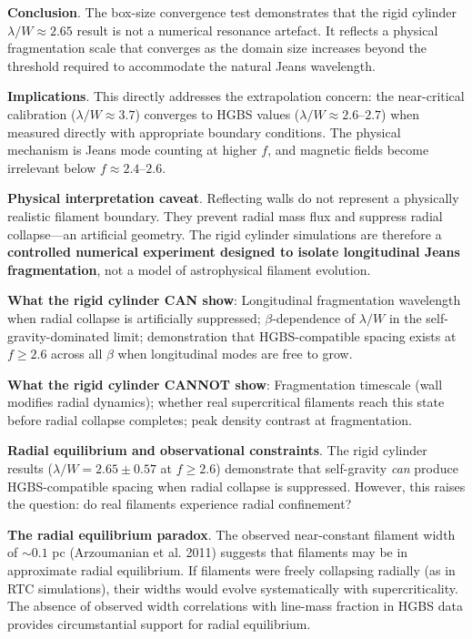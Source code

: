 \documentclass[twocolumn,usenatbib]{mnras}
\begin{document}
\textbf{Conclusion}. The box-size convergence test demonstrates that the rigid cylinder $\lambda/W \approx 2.65$ result is not a numerical resonance artefact. It reflects a physical fragmentation scale that converges as the domain size increases beyond the threshold required to accommodate the natural Jeans wavelength.

\textbf{Implications}. This directly addresses the extrapolation concern: the near-critical calibration ($\lambda/W \approx 3.7$) converges to HGBS values ($\lambda/W \approx 2.6$--$2.7$) when measured directly with appropriate boundary conditions. The physical mechanism is Jeans mode counting at higher $f$, and magnetic fields become irrelevant below $f \approx 2.4$--$2.6$.

\textbf{Physical interpretation caveat}. Reflecting walls do not represent a physically realistic filament boundary. They prevent radial mass flux and suppress radial collapse---an artificial geometry. The rigid cylinder simulations are therefore a \textbf{controlled numerical experiment designed to isolate longitudinal Jeans fragmentation}, not a model of astrophysical filament evolution.

\textbf{What the rigid cylinder CAN show}: Longitudinal fragmentation wavelength when radial collapse is artificially suppressed; $\beta$-dependence of $\lambda/W$ in the self-gravity-dominated limit; demonstration that HGBS-compatible spacing exists at $f \geq 2.6$ across all $\beta$ when longitudinal modes are free to grow.

\textbf{What the rigid cylinder CANNOT show}: Fragmentation timescale (wall modifies radial dynamics); whether real supercritical filaments reach this state before radial collapse completes; peak density contrast at fragmentation.

\noindent\textbf{Radial equilibrium and observational constraints}. The rigid cylinder results ($\lambda/W = 2.65 \pm 0.57$ at $f \geq 2.6$) demonstrate that self-gravity \textit{can} produce HGBS-compatible spacing when radial collapse is suppressed. However, this raises the question: do real filaments experience radial confinement?

\noindent\textbf{The radial equilibrium paradox}. The observed near-constant filament width of $\sim0.1$ pc (Arzoumanian et al. 2011) suggests that filaments may be in approximate radial equilibrium. If filaments were freely collapsing radially (as in RTC simulations), their widths would evolve systematically with supercriticality. The absence of observed width correlations with line-mass fraction in HGBS data provides circumstantial support for radial equilibrium.
\end{document}

